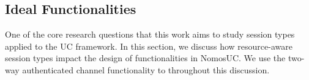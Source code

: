 

\subsection{Ideal Functionalities}
One of the core research questions that this work aims to study session types applied to the UC framework. 
In this section, we discuss how resource-aware session types impact the design of functionalities in NomosUC.
We use the two-way authenticated channel functionality \Fauth to throughout this discussion.

